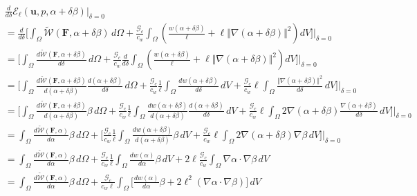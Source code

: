 \documentclass[12pt,3p]{article}
\numberwithin{equation}{section}
\begin{document}
\begin{align*}
& \frac{d}{d \delta} \mathcal{E}_\ell (\bm{u}, p, \alpha + \delta \beta) \big\rvert_{\delta = 0} \\
	&= \frac{d}{d \delta} \bigg[ \int_\Omega  \widetilde{\mathcal{W}}(\mathbf{F}, \alpha + \delta \beta)\,  d\Omega +\frac{\mathcal{G}_c}{c_w}\int_\Omega \left(\frac{w(\alpha + \delta \beta)}{\ell} + \ell \Vert \nabla (\alpha + \delta \beta)  \Vert^2\right) dV \bigg] \bigg\rvert_{\delta = 0} \\
	&= \bigg[ \int_\Omega  \frac{d \widetilde{\mathcal{W}}(\mathbf{F}, \alpha + \delta \beta)}{d \delta} \,  d\Omega + \frac{\mathcal{G}_c}{c_w} \frac{d}{d \delta} \int_\Omega \left(\frac{w(\alpha + \delta \beta)}{\ell} + \ell \Vert \nabla (\alpha + \delta \beta)  \Vert^2\right) dV \bigg] \bigg\rvert_{\delta = 0} \\
	&= \bigg[ \int_\Omega \frac{d \widetilde{\mathcal{W}}(\mathbf{F}, \alpha + \delta \beta)}{d (\alpha + \delta \beta)} \frac{d (\alpha + \delta \beta)}{d \delta} \, d\Omega + \frac{\mathcal{G}_c}{c_w} \frac{1}{\ell} \int_\Omega \frac{d w(\alpha + \delta \beta)}{d \delta} \, dV+ \frac{\mathcal{G}_c}{c_w} \ell \int_{\Omega} \frac{\Vert \nabla (\alpha + \delta \beta)  \Vert^2}{d \delta} \, dV \bigg] \bigg\rvert_{\delta = 0} \\
	&= \bigg[ \int_\Omega \frac{d \widetilde{\mathcal{W}}(\mathbf{F}, \alpha + \delta \beta)}{d (\alpha + \delta \beta)} \beta \, d\Omega + \frac{\mathcal{G}_c}{c_w} \frac{1}{\ell} \int_\Omega \frac{d w(\alpha + \delta \beta)}{d (\alpha + \delta \beta)} \frac{d (\alpha + \delta \beta)}{d \delta} \, dV + \frac{\mathcal{G}_c}{c_w} \ell \int_{\Omega} 2 \nabla (\alpha + \delta \beta) \frac{\nabla (\alpha + \delta \beta)}{d \delta} \, dV \bigg] \bigg\rvert_{\delta = 0} \\
	&= \int_\Omega \frac{d \widetilde{\mathcal{W}}(\mathbf{F}, \alpha)}{d \alpha} \beta \, d\Omega + \bigg[ \frac{\mathcal{G}_c}{c_w} \frac{1}{\ell} \int_\Omega \frac{d w(\alpha + \delta \beta)}{d (\alpha + \delta \beta)} \beta \, dV + \frac{\mathcal{G}_c}{c_w} \ell \int_{\Omega} 2 \nabla (\alpha + \delta \beta) \nabla \beta \, dV \bigg] \bigg\rvert_{\delta = 0} \\
	&= \int_\Omega \frac{d \widetilde{\mathcal{W}}(\mathbf{F}, \alpha)}{d \alpha} \beta \, d\Omega +  \frac{\mathcal{G}_c}{c_w} \frac{1}{\ell} \int_\Omega \frac{d w(\alpha)}{d \alpha} \beta \, dV + 2 \ell \frac{\mathcal{G}_c}{c_w} \int_{\Omega} \nabla \alpha \cdot \nabla \beta \, dV \\
	&= \int_\Omega \frac{d \widetilde{\mathcal{W}}(\mathbf{F}, \alpha)}{d \alpha} \beta \, d\Omega + \frac{\mathcal{G}_c}{c_w \ell} \int_\Omega \bigg[ \frac{d w(\alpha)}{d \alpha} \beta + 2 \ell^2 (\nabla \alpha \cdot \nabla \beta) \bigg] \, dV 
\end{align*}
\end{document}
